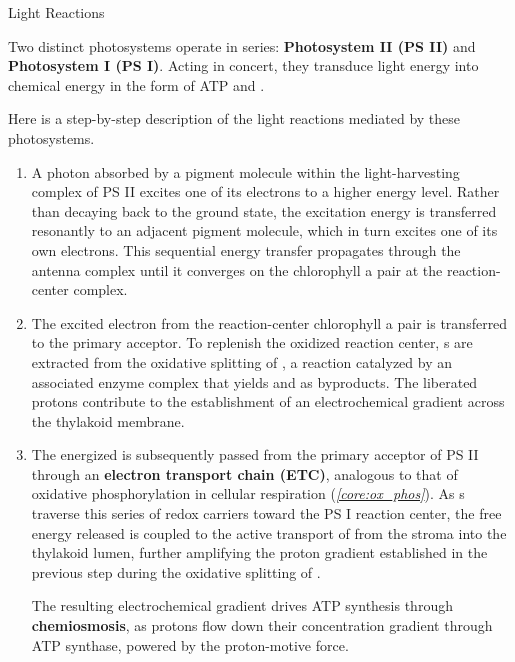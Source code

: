 \documentclass[10pt]{article}
\begin{document}
\begin{core}{Light Reactions}

      Two distinct photosystems operate in series: \textbf{Photosystem II (PS II)} and \textbf{Photosystem I (PS I)}. Acting in concert, they transduce light energy into chemical energy in the form of ATP and .

      Here is a step-by-step description of the light reactions mediated by these photosystems.


      \begin{enumerate}[label=(\arabic*)]

        \item A photon absorbed by a pigment molecule within the light-harvesting complex of PS II excites one of its electrons to a higher energy level. Rather than decaying back to the ground state, the excitation energy is transferred resonantly to an adjacent pigment molecule, which in turn excites one of its own electrons. This sequential energy transfer propagates through the antenna complex until it converges on the chlorophyll a pair at the reaction-center complex.

        \item The excited electron from the reaction-center chlorophyll a pair is transferred to the primary  acceptor. To replenish the oxidized reaction center, s are extracted from the oxidative splitting of , a reaction catalyzed by an associated enzyme complex that yields  and  as byproducts. The liberated protons contribute to the establishment of an electrochemical gradient across the thylakoid membrane.

        \item The energized  is subsequently passed from the primary acceptor of PS II through an \textbf{electron transport chain (ETC)}, analogous to that of oxidative phosphorylation in cellular respiration (\textit{\autoref{core:ox_phos}}). As s traverse this series of redox carriers toward the PS I reaction center, the free energy released is coupled to the active transport of  from the stroma into the thylakoid lumen, further amplifying the proton gradient established in the previous step during the oxidative splitting of .

        The resulting electrochemical gradient drives ATP synthesis through \textbf{chemiosmosis}, as protons flow down their concentration gradient through ATP synthase, powered by the proton-motive force.


\end{enumerate}
\end{core}
\end{document}
